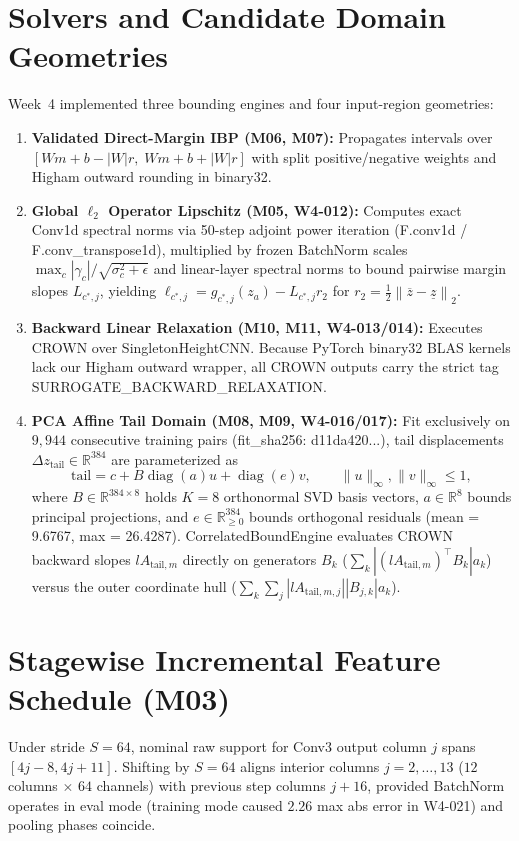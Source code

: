 \documentclass[11pt,oneside,a4paper]{report}
\newcommand{\R}{\mathbb{R}}
\newcommand{\norm}[1]{\left\lVert #1\right\rVert}
\newcommand{\code}[1]{{\small\upshape\ttfamily #1}}
\newcommand{\diag}{\operatorname{diag}}
\theoremstyle{remark}
\begin{document}
\section{Solvers and Candidate Domain Geometries}
Week~4 implemented three bounding engines and four input-region geometries:
\begin{enumerate}[leftmargin=1.5em]
  \item \textbf{Validated Direct-Margin IBP (\code{M06}, \code{M07}):} Propagates intervals over $[W m + b - |W|r,\; W m + b + |W|r]$ with split positive/negative weights and Higham outward rounding in \code{binary32}.
  \item \textbf{Global $\ell_2$ Operator Lipschitz (\code{M05}, \code{W4-012}):} Computes exact Conv1d spectral norms via 50-step adjoint power iteration (\code{F.conv1d} / \code{F.conv\_transpose1d}), multiplied by frozen BatchNorm scales $\max_c |\gamma_c|/\sqrt{\sigma_c^2+\epsilon}$ and linear-layer spectral norms to bound pairwise margin slopes $L_{c^*,j}$, yielding $\ell_{c^*,j} = g_{c^*,j}(z_a) - L_{c^*,j} r_2$ for $r_2 = \frac{1}{2}\norm{\overline{z}-\underline{z}}_2$.
  \item \textbf{Backward Linear Relaxation (\code{M10}, \code{M11}, \code{W4-013/014}):} Executes CROWN over \code{SingletonHeightCNN}. Because PyTorch \code{binary32} BLAS kernels lack our Higham outward wrapper, all CROWN outputs carry the strict tag \code{SURROGATE\_BACKWARD\_RELAXATION}.
  \item \textbf{PCA Affine Tail Domain (\code{M08}, \code{M09}, \code{W4-016/017}):} Fit exclusively on $9{,}944$ consecutive training pairs (\code{fit\_sha256: d11da420...}), tail displacements $\Delta z_{\text{tail}} \in \R^{384}$ are parameterized as
  \begin{equation}
  \text{tail} = c + B \diag(a) u + \diag(e) v, \qquad \|u\|_\infty, \|v\|_\infty \le 1,
  \end{equation}
  where $B \in \R^{384 \times 8}$ holds $K=8$ orthonormal SVD basis vectors, $a \in \R^8$ bounds principal projections, and $e \in \R^{384}_{\ge 0}$ bounds orthogonal residuals (\code{mean = 9.6767}, \code{max = 26.4287}). \code{CorrelatedBoundEngine} evaluates CROWN backward slopes $lA_{\text{tail},m}$ directly on generators $B_k$ ($\sum_k |(lA_{\text{tail},m})^\top B_k| a_k$) versus the outer coordinate hull ($\sum_k \sum_j |lA_{\text{tail},m,j}||B_{j,k}| a_k$).
\end{enumerate}

\section{Stagewise Incremental Feature Schedule (\code{M03})}\label{sec:m03}
Under stride $S=64$, nominal raw support for \code{Conv3} output column $j$ spans $[4j-8, 4j+11]$. Shifting by $S=64$ aligns interior columns $j=2,\dots,13$ ($12$ columns $\times$ $64$ channels) with previous step columns $j+16$, provided BatchNorm operates in \code{eval} mode (training mode caused $2.26$ max abs error in \code{W4-021}) and pooling phases coincide.
\end{document}
